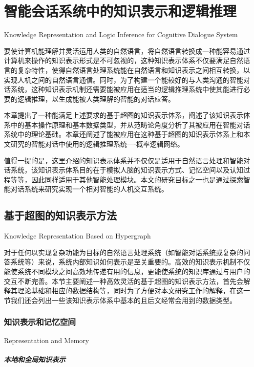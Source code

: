 \chapter{智能会话系统中的知识表示和逻辑推理}{Knowledge Representation and Logic Inference for Cognitive Dialogue System}
\label{chap:representation}


要使计算机能理解并灵活运用人类的自然语言，将自然语言转换成一种能容易通过计算机来操作的知识表示形式是不可忽视的，这种知识表示体系不仅要满足自然语言的复杂特性，使得自然语言处理系统能在自然语言和知识表示之间相互转换，以实现人机之间的自然语言通信。同时，为了构建一个能较好的与人类沟通的智能对话系统，这种知识表示机制还需要能被应用在适当的逻辑推理系统中使其能进行必要的逻辑推理，以生成能被人类理解的智能的对话应答。

本章提出了一种能满足上述要求的基于超图的知识表示体系，阐述了该知识表示体系中的基本操作原理和基本数据类型，并从范畴论角度分析了其被应用在智能对话系统中的理论基础。本章还阐述了能被应用在这种基于超图的知识表示体系上和本文研究的智能对话中使用的逻辑推理系统----概率逻辑网络。

值得一提的是，这里介绍的知识表示体系并不仅仅是适用于自然语言处理和智能对话系统，该知识表示体系目的在于模拟人脑的知识表示方式、记忆空间以及认知过程等等，因此同样适用于其他智能处理模块。本文的研究目标之一也是通过探索智能对话系统来研究实现一个相对智能的人机交互系统。

\section{基于超图的知识表示方法}{Knowledge Representation Based on Hypergraph}

对于任何以实现复杂功能为目标的自然语言处理系统（如智能对话系统或复杂的问答系统等）来说，系统内部知识如何表示是至关重要的。高效的知识表示机制不仅能使系统不同模块之间高效地传递有用的信息，更能使系统的知识库通过与用户的交互不断完善。本节主要阐述一种高效灵活的基于超图的知识表示方法，首先会解释其理论基础和相应的数据结构等，同时为了方便对本文研究工作的解释，在这一节我们还会列出一些该知识表示体系中基本的且后文经常会用到的数据类型。

\subsection{知识表示和记忆空间}{Representation and Memory}

\paragraph{本地和全局知识表示}

